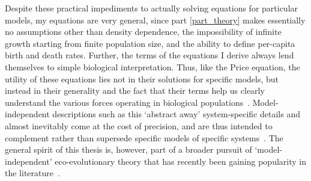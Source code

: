 Despite these practical impediments to actually solving equations for particular models, my equations are very general, since part \ref{part_theory} makes essentially no assumptions other than density dependence, the impossibility of infinite growth starting from finite population size, and the ability to define per-capita birth and death rates. Further, the terms of the equations I derive always lend themselves to simple biological interpretation. Thus, like the Price equation, the utility of these equations lies not in their solutions for specific models, but instead in their generality and the fact that their terms help us clearly understand the various forces operating in biological populations~\citep{frank_natural_2012,luque_one_2017, luque_mirror_2021}. Model-independent descriptions such as this `abstract away' system-specific details and almost inevitably come at the cost of precision, and are thus intended to complement rather than supersede specific models of specific systems~\citep{levins_strategy_1966, potochnik_idealization_2018}. The general spirit of this thesis is, however, part of a broader pursuit of `model-independent' eco-evolutionary theory that has recently been gaining popularity in the literature~\citep{grafen_formal_2014, queller_fundamental_2017, doebeli_towards_2017, lion_theoretical_2018, allen_mathematical_2019, rice_universal_2020, week_white_2021, wickman_theoretical_2022, kuosmanen_turnover_2022, mazzolini_universality_2022,lion_extending_2023,allen_natural_2023}.

